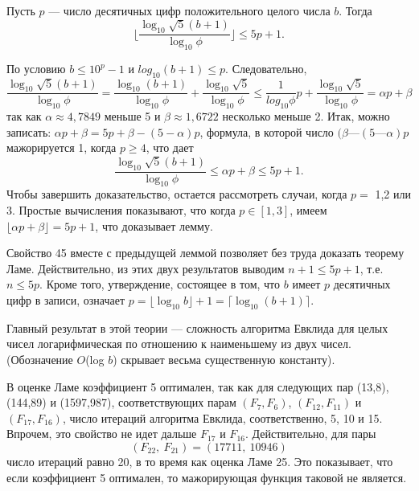 \documentclass{mai_book}
\begin{document}
\begin{lemma}
\hspace*{15pt}Пусть $p$ — число десятичных цифр положительного целого числа $b$. 
Тогда 
\begin{equation*}
\lfloor \frac{\log_{10}{\sqrt{5}(b+1)}}{\log_{10}{\phi}} \rfloor \leqslant 5p + 1.
\end{equation*}
\end{lemma}
\newpage

\begin{myproof}
По условию $b \leqslant 10^p - 1$ и $log_{10}{(b+1)} \leqslant p$. Следовательно,
\begin{equation*}
\frac{\log_{10}{\sqrt{5}(b+1)}}{\log_{10}{\phi}} = \frac{\log_{10}{(b+1)}}{\log_{10}{\phi}} + \frac{\log_{10}{\sqrt{5}}}{\log_{10}{\phi}} \leqslant \frac{1}{log_{10}{\phi}}p + \frac{\log_{10}{\sqrt{5}}}{\log_{10}{\phi}} = \alpha p + \beta
\end{equation*}
так как $\alpha \approx 4,7849$ меньше 5 и $\beta \approx 1,6722$ несколько меньше 2. 
Итак, можно записать: $\alpha p + \beta = 5p + \beta - (5 - \alpha)p$, формула, в которой 
число $(\beta — (5 — \alpha)p$ мажорируется 1, когда $p \geq 4$, что дает
\begin{equation*}
\frac{\log_{10}{\sqrt{5}(b+1)}}{\log_{10}{\phi}} \leqslant \alpha p + \beta \leqslant 5p + 1.
\end{equation*}
Чтобы завершить доказательство, остается рассмотреть случаи, 
когда $p =$ 1,2 или 3. Простые вычисления показывают, что когда 
$p \in [1,3]$, имеем $\lfloor \alpha p + \beta \rfloor = 5p + 1$, что доказывает лемму.
\end{myproof} 

\begin{myproof}
Свойство 45 вместе с предыдущей леммой позволяет без труда  
доказать теорему Ламе. Действительно, из этих двух результатов  
выводим $n + 1 \leqslant 5p + 1$, т.е. $n \leqslant 5p$. Кроме того, утверждение,  
состоящее в том, что $b$ имеет $p$ десятичных цифр в записи, означает 
$p = \lfloor \log_{10}{b} \rfloor + 1 = \lceil \log_{10}{(b+1)} \rceil$.
\end{myproof}

Главный результат в этой теории — сложность алгоритма  
Евклида для целых чисел логарифмическая по отношению к наименьшему из 
двух чисел. (Обозначение $O$(log $b$) скрывает весьма существенную  
константу).

\begin{mynotice}
В оценке Ламе коэффициент 5 оптимален, так как 
для следующих пар (13,8), (144,89) и (1597,987),  
соответствующих парам $(F_7,F_6)$, $(F_{12},F_{11})$ и $(F_{17},F_{16})$, число итераций  
алгоритма Евклида, соответственно, 5, 10 и 15. Впрочем, это свойство 
не идет дальше $F_{17}$ и $F_{16}$. Действительно, для пары
\begin{equation*}
(F_{22},\: F_{21}) = (17711,\: 10946)
\end{equation*} 
число итераций равно 20, в то время как оценка Ламе 25. Это  
показывает, что если коэффициент 5 оптимален, то мажорирующая 
функция таковой не является. 
\end{mynotice} 
\end{document}
